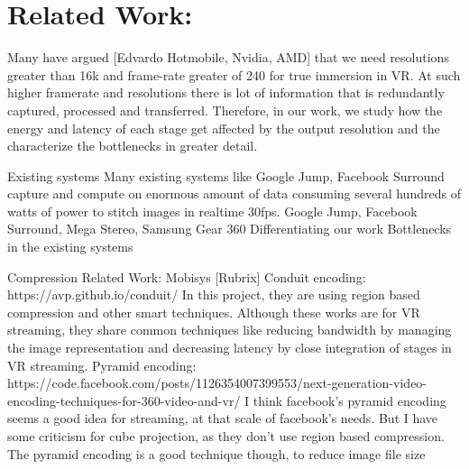 \section{Related Work:}

Many have argued [Edvardo Hotmobile, Nvidia, AMD] that we need resolutions greater than 16k and frame-rate greater of 240 for true immersion in VR. At such higher framerate and resolutions there is lot of information that is redundantly captured, processed and transferred. Therefore, in our work, we study how the energy and latency of each stage get affected by the output resolution and the characterize the bottlenecks in greater detail. 

Existing systems \newline
Many existing systems like Google Jump, Facebook Surround capture and compute on enormous amount of data consuming several hundreds of watts of power to stitch images in realtime 30fps. 
Google Jump, Facebook Surround, Mega Stereo, Samsung Gear 360 \newline
Differentiating our work \newline
Bottlenecks in the existing systems \newline


Compression Related Work: 
Mobisys [Rubrix]
Conduit encoding:
https://avp.github.io/conduit/
In this  project, they are using region based compression and other smart techniques. Although these works are for VR streaming, they share common techniques like reducing bandwidth by managing the image representation and decreasing latency by close integration of stages in VR streaming.
Pyramid encoding: https://code.facebook.com/posts/1126354007399553/next-generation-video-encoding-techniques-for-360-video-and-vr/
I think facebook's pyramid encoding seems a good idea for streaming, at that scale of facebook's needs. But I have some criticism for  cube projection, as they don't use region based compression. The pyramid encoding is a good technique though, to reduce image file size

